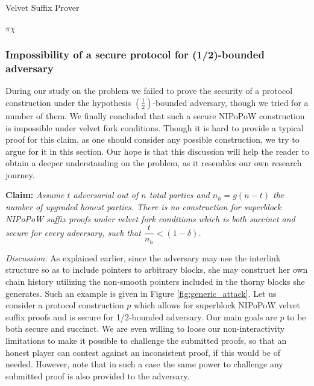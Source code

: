 \begin{algorithm}[h!]
		\caption{\label{alg:velvet_suffix_prover}Velvet Suffix Prover}
		\begin{algorithmic}
						\Let{\pi}{\pi \cup \alpha}
					\EndFor
					\State\Return$\pi\chi$
				\EndFunction
		\end{algorithmic}
\end{algorithm}

\subsubsection{Impossibility of a secure protocol for (1/2)-bounded adversary}
During our study on the problem we failed to prove the security of a protocol
construction under the hypothesis $(\frac{1}{2})$-bounded adversary, though we tried for a number of them. We finally concluded that
such a secure NIPoPoW construction is impossible under velvet fork conditions.
Though it is hard to provide a typical proof for this claim, as one should consider
any possible construction, we try to argue for it in this section. Our hope is that this discussion will help the reader to obtain a deeper understanding on the problem, as it resembles our own research journey.

\textbf{Claim:} \textit{Assume $t$ adversarial out of $n$ total parties and $n_h = g(n-t)$ the number of upgraded honest parties.
There is no construction for superblock NIPoPoW suffix proofs under velvet fork conditions
which is both succinct and secure for every adversary, such that
$\dfrac{t}{n_h} < (1 - \delta)$.}

\textit{Discussion.} As explained earlier, since the adversary may use the interlink structure so as to include pointers to arbitrary blocks,  she may construct her own
chain history utilizing the non-smooth pointers included in the thorny blocks she
generates. Such an example is given in Figure \ref{fig:generic_attack}. Let us consider a protocol construction $p$ which allows for  superblock NIPoPoW velvet suffix proofs and is secure for 1/2-bounded adversary. Our main
goals are $p$ to be both secure and succinct. We are even willing to loose our non-interactivity
limitations to make it possible to challenge the submitted proofs, so that an honest
player can contest against an inconsistent proof, if this would be of needed. However, note that in such a case the same power
to challenge any submitted proof is also provided to the adversary.

